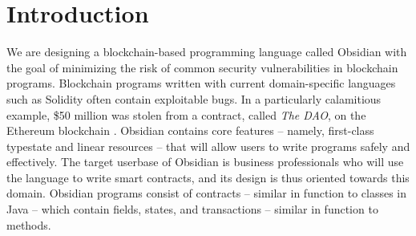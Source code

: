 \documentclass[sigplan,10pt,review]{acmart}\settopmatter{printfolios=true}
\begin{document}
\maketitle
\renewcommand{\shortauthors}{Barnaby et al.}

\section{Introduction}


We are designing a blockchain-based programming language called Obsidian \cite{Coblenz} with the goal of 
minimizing the risk of common security vulnerabilities in blockchain programs. Blockchain
programs written with current domain-specific languages such as Solidity \cite{Solidity} often contain
exploitable bugs. In a particularly calamitious example, \$50 million was stolen from a contract, called \textit{The DAO},  on the 
Ethereum blockchain \cite{Sirer}. Obsidian contains core features
 -- namely, first-class typestate and linear resources -- that will allow users 
to write programs safely and effectively. The target 
userbase of Obsidian is business professionals who will use the language to write smart contracts, 
and its design is thus oriented towards this domain. Obsidian programs consist of contracts --
similar in function to classes in Java -- which contain fields, states, and transactions -- similar in
function to methods.
\end{document}

